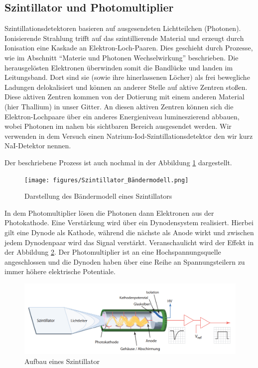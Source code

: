 \documentclass{article}
\begin{document}
\subsection{Szintillator und Photomultiplier}
Szintillationsdetektoren basieren auf ausgesendeten Lichtteilchen (Photonen). Ionisierende Strahlung trifft auf das szintillierende Material 
und erzeugt durch Ionisation eine Kaskade an Elektron-Loch-Paaren. Dies geschieht durch Prozesse, wie im Abschnitt \enquote{Materie und Photonen Wechselwirkung} 
beschrieben. Die herausgelösten Elektronen überwinden somit die Bandlücke und landen im Leitungsband. Dort sind sie (sowie ihre hinerlassenen Löcher) 
als frei bewegliche Ladungen delokalisiert und können an anderer Stelle auf aktive Zentren stoßen. Diese aktiven Zentren kommen von der Dotierung mit 
einem anderen Material (hier Thallium) in unser Gitter. An diesen aktiven Zentren können sich die Elektron-Lochpaare über ein anderes Energieniveau 
lumineszierend abbauen, wobei Photonen im nahen bis sichtbaren Bereich ausgesendet werden. Wir verwenden in dem Versuch einen 
Natrium-Iod-Szintillationsdetektor den wir kurz NaI-Detektor nennen.

Der beschriebene Prozess ist auch nochmal in der Abbildung \ref{fig:SzintillatorBandlücke} dargestellt.

\begin{figure}
    \centering
    \texttt{[image: figures/Szintillator\_Bändermodell.png]}
    \caption{Darstellung des Bändermodell eines Szintillators \cite{Wer}}
    \label{fig:SzintillatorBandlücke}
\end{figure}

In dem Photomultiplier lösen die Photonen dann Elektronen aus der Photokathode. Eine Verstärkung wird über ein Dynodensystem realisiert. Hierbei gilt eine Dynode als Kathode, während die nächste als Anode wirkt und zwischen jedem Dynodenpaar wird das Signal verstärkt. Veranschaulicht wird der Effekt in der Abbildung \ref{fig:AufbauSzinti}. Der Photomultiplier ist an eine Hochspannungsquelle angeschlossen und die Dynoden haben über eine Reihe an Spannungsteilern zu immer höhere elektrische Potentiale.

\begin{figure}[H]
    \centering
    \includegraphics[width=1\linewidth]{figures/SzintillatorAufbau.png}
    \caption{Aufbau eines Szintillator \cite{Wer}}
    \label{fig:AufbauSzinti}
\end{figure}
\end{document}

